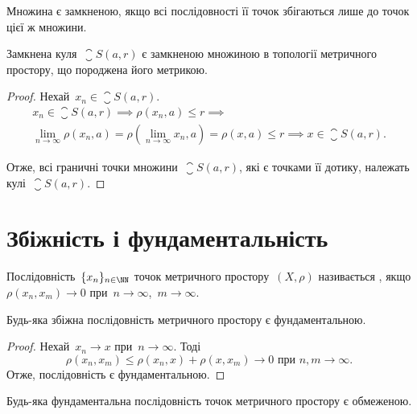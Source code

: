 \begin{corollary}
Множина є замкненою, якщо всі
послідовності її точок збігаються лише до точок цієї ж
множини.
\end{corollary}

\begin{theorem}
Замкнена куля~$\closure S(a, r)$ є замкненою
множиною в топології метричного простору, що
породжена його метрикою.
\end{theorem}

\begin{proof}
Нехай~$x_n \in \closure S(a, r)$.
\begin{multline*}
    x_n \in \closure S(a, r) \implies
    \rho(x_n, a) \le r \implies \\
    \lim_{n \to \infty} \rho(x_n, a) = \rho\left(\lim_{n \to \infty} x_n, a\right) = \rho(x, a) \le r \implies
    x \in \closure S(a, r).
\end{multline*}

Отже, всі граничні точки множини~$\closure S(a, r)$, які є точками
її дотику, належать кулі~$\closure S(a, r)$. 
\end{proof}

\section{Збіжність і фундаментальність}

\begin{definition}
Послідовність~$\{x_n\}_{n \in \NN}$ точок метричного
простору~$(X, \rho)$ називається , якщо
$\rho(x_n, x_m) \to 0$ при~$n \to \infty$,~$m \to \infty$.
\end{definition}

\begin{lemma}
Будь-яка збіжна послідовність метричного
простору є фундаментальною.
\end{lemma}

\begin{proof}
Нехай~$x_n \to x$ при~$n \to \infty$. Тоді
\begin{equation*}
    \rho(x_n, x_m) \le \rho(x_n, x) + \rho(x, x_m) \to 0 \text{ при } n, m \to \infty.
\end{equation*}
Отже, послідовність є фундаментальною. 
\end{proof}

\begin{lemma}
Будь-яка фундаментальна послідовність
точок метричного простору є обмеженою.
\end{lemma}

